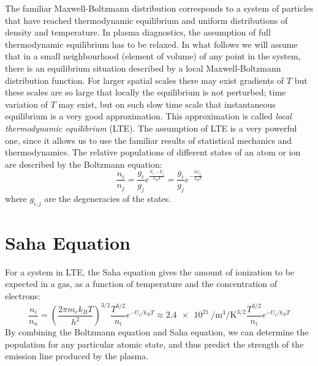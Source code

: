 \documentclass[justified,nofonts,nobib]{tufte-book}
\begin{document}
The familiar Maxwell-Boltzmann distribution corresponds to a system of particles that have reached thermodynamic equilibrium and uniform distributions of density and temperature. In plasma diagnostics, the assumption of full thermodynamic equilibrium has to be relaxed. In what follows we will assume that in a small neighbourhood (element of volume) of any point in the system, there is an equilibrium situation described by a local Maxwell-Boltzmann distribution function. For larger spatial scales there may exist gradients of $T$ but these scales are so large that locally the equilibrium is not perturbed; time variation of $T$ may exist, but on such slow time scale that instantaneous equilibrium is a very good approximation. This approximation is  called \emph{local thermodynamic equilibrium} (LTE). The assumption of LTE is a very powerful one, since it allows us to use the familiar results of statistical mechanics and thermodynamics. The relative populations of different states of an atom or ion are described by the Boltzmann equation:
\begin{equation}
		\frac{n_i}{n_j}=\frac{g_i}{g_j}e^{\frac{E_i-E_j}{k_B T}}=\frac{g_i}{g_j}e^{-\frac{h\nu_{ij}}{k_B T}}
\end{equation}
where $g_{i,j}$ are the degeneracies of the states. 

\section{Saha Equation}\label{sec:saha}
For a system in LTE, the Saha equation gives the amount of ionization to be expected in a gas, as a function of temperature and the concentration of electrons:
\begin{equation}
		\frac{n_i}{n_n}= \left(\frac{2 \pi m_e k_B T}{h^2}\right)^{3/2}\frac{T^{3/2}}{n_i}e^{-U_i/k_B T} \approx \SI{2.4e21}{\per \metre\cubed \per\kelvin\tothe{3/2}} \frac{T^{3/2}}{n_i}e^{-U_i/k_B T}
\end{equation}
By combining the Boltzmann equation and Saha equation, we can determine the population for any particular atomic state, and thus predict the strength of the emission line produced by the plasma.
\end{document}
